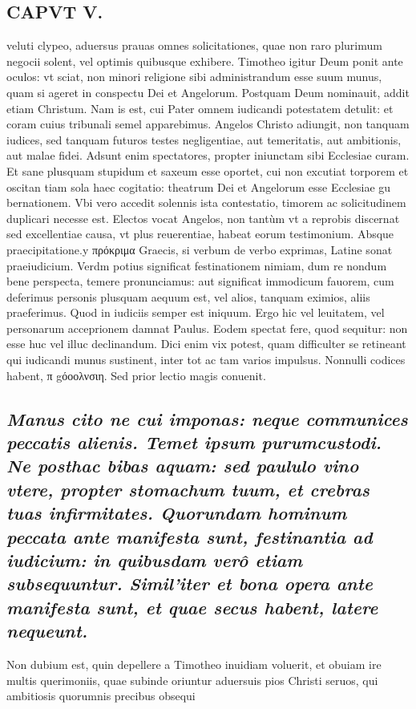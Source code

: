 \documentclass{article}
\begin{document}
\begin{pages}
\section*{CAPVT V. }
\marginpar{[ p.69 ]}\pstart veluti clypeo, aduersus prauas omnes solicitationes, quae non raro plurimum negocii solent, vel optimis quibusque exhibere. Timotheo igitur Deum ponit ante oculos: vt sciat, non minori religione sibi administrandum esse suum munus, quam si ageret in conspectu Dei et Angelorum. Postquam Deum nominauit, addit etiam Christum. Nam is est, cui Pater omnem iudicandi potestatem detulit: et coram cuius tribunali semel apparebimus. Angelos Christo adiungit, non tanquam iudices, sed tanquam futuros testes negligentiae, aut temeritatis, aut ambitionis, aut malae fidei. Adsunt enim spectatores, propter iniunctam sibi Ecclesiae curam. Et sane plusquam stupidum et saxeum esse oportet, cui non excutiat torporem et oscitan tiam sola haec cogitatio: theatrum Dei et Angelorum esse Ecclesiae gu bernationem. Vbi vero accedit solennis ista contestatio, timorem ac solicitudinem duplicari necesse est. Electos vocat Angelos, non tantùm vt a reprobis discernat sed excellentiae causa, vt plus reuerentiae, habeat eorum testimonium.  \pend\pstart Absque praecipitatione.y πρόκριμα Graecis, si verbum de verbo exprimas, Latine sonat praeiudicium. Verdm potius significat festinationem nimiam, dum re nondum bene perspecta, temere pronunciamus: aut significat immodicum fauorem, cum deferimus personis plusquam aequum est, vel alios, tanquam eximios, aliis praeferimus. Quod in iudiciis semper est iniquum. Ergo hic vel leuitatem, vel personarum acceprionem damnat Paulus. Eodem spectat fere, quod sequitur: non esse huc vel illuc declinandum. Dici enim vix potest, quam difficulter se retineant qui iudicandi munus sustinent, inter tot ac tam varios impulsus. Nonnulli codices habent, π gόοολνσιη. Sed prior lectio magis conuenit.  \pend
{}
{}
\subsection*{\textit{Manus cito ne cui imponas: neque communices peccatis alienis. Temet ipsum purumcustodi. Ne posthac bibas aquam: sed paululo vino vtere, propter stomachum tuum, et crebras tuas infirmitates. Quorundam hominum peccata ante manifesta sunt, festinantia ad iudicium: in quibusdam verô etiam subsequuntur. Simil’iter et bona opera ante manifesta sunt, et quae secus habent, latere nequeunt. }}\pstart Non dubium est, quin depellere a Timotheo inuidiam voluerit, et obuiam ire multis querimoniis, quae subinde oriuntur aduersuis pios Christi seruos, qui ambitiosis quorumnis precibus obsequi  \pend

\end{pages}
\end{document}
